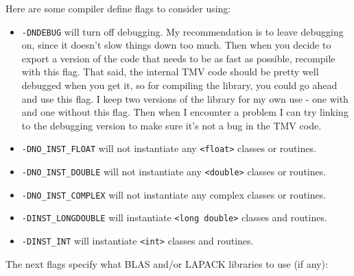 \documentclass[twoside,letterpaper,11pt]{article}
\renewcommand{\tt}[1]{{\lstinline {#1}}}
\begin{document}
Here are some compiler define flags to consider using:
\begin{itemize}
\item
\texttt{-DNDEBUG} will turn off debugging.  My recommendation is to leave debugging
on, since it doesn't slow things down too much.  Then when you decide to 
export a version of the code that needs to be as fast as possible, recompile
with this flag.  That said, the internal TMV code should be pretty well debugged
when you get it, so for compiling the library, you could go ahead and use this flag.
I keep two versions of the library for my own use - one with and one without 
this flag.  Then when I encounter a problem I can try linking to the debugging 
version to make sure it's not a bug in the TMV code.
\item
\texttt{-DNO\_INST\_FLOAT} will not instantiate any \tt{<float>} classes or routines.
\item
\texttt{-DNO\_INST\_DOUBLE} will not instantiate any \tt{<double>} classes or routines.
\item
\texttt{-DNO\_INST\_COMPLEX} will not instantiate any complex classes or routines.
\item
\texttt{-DINST\_LONGDOUBLE} will instantiate \tt{<long double>} classes and routines.
\item
\texttt{-DINST\_INT} will instantiate \tt{<int>} classes and routines.
\end{itemize}
The next flags specify what BLAS and/or LAPACK libraries to use (if any):
\end{document}
